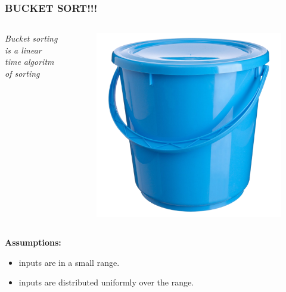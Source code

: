 \documentclass[pdf]{beamer}
\begin{document}
\begin{frame}
	\frametitle{BUCKET SORT!!!}
	\begin{columns}
		\begin{block}{
			\color{black}\textit{Bucket sorting is a linear time algoritm of sorting}}
		\end{block}
		\pause
		\begin{figure}
			\includegraphics[scale=0.1]{Figure/bucket.png}
		\end{figure}
	\end{columns}

\end{frame}


\begin{frame}
	\textbf{Assumptions:}
	\begin{itemize}
		\pause
		\item inputs are in a small range.
		\pause
		\item inputs are distributed uniformly over the range.
	\end{itemize}
\end{frame}

\begin{frame}
	\frametitle{}
\end{frame}
\end{document}
